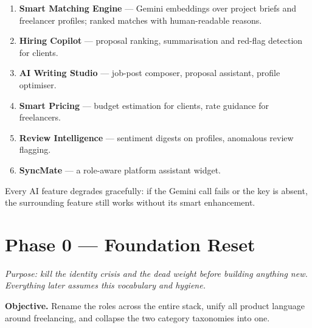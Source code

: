 \documentclass[11pt,a4paper]{article}
\newcommand{\objective}[1]{\noindent\textbf{Objective.} #1\medskip}
\begin{document}
\begin{enumerate}[leftmargin=1.6em]
  \item \textbf{Smart Matching Engine} --- Gemini embeddings over project briefs and
        freelancer profiles; ranked matches with human-readable reasons.
  \item \textbf{Hiring Copilot} --- proposal ranking, summarisation and red-flag
        detection for clients.
  \item \textbf{AI Writing Studio} --- job-post composer, proposal assistant,
        profile optimiser.
  \item \textbf{Smart Pricing} --- budget estimation for clients, rate guidance for
        freelancers.
  \item \textbf{Review Intelligence} --- sentiment digests on profiles, anomalous
        review flagging.
  \item \textbf{SyncMate} --- a role-aware platform assistant widget.
\end{enumerate}

Every AI feature degrades gracefully: if the Gemini call fails or the key is absent,
the surrounding feature still works without its smart enhancement.

\newpage
\section{Phase 0 --- Foundation Reset}

\textit{Purpose: kill the identity crisis and the dead weight before building
anything new. Everything later assumes this vocabulary and hygiene.}

\objective{Rename the roles across the entire stack, unify all product language
around freelancing, and collapse the two category taxonomies into one.}
\end{document}
